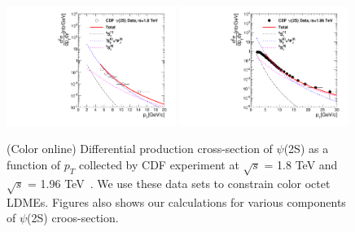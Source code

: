 \documentclass[aps,prc,preprint,superscriptaddress,showpacs,showkeys,amsmath]{revtex4-1}
\begin{document}
\begin{figure}
\includegraphics[width=0.49\textwidth]{Figures/Psi2S/Psi2S_CDF_180TeV.pdf}
\includegraphics[width=0.49\textwidth]{Figures/Psi2S/Psi2S_CDF_196TeV.pdf}
\caption{(Color online) Differential production cross-section of $\psi$(2S) as a function of $p_{T}$ 
collected by CDF experiment at $\sqrt{s}$ = 1.8 TeV and $\sqrt{s}$ = 1.96 TeV~\cite{Acosta:2004yw}. 
We use these data sets to constrain color octet LDMEs. Figures also shows our calculations for various components 
of $\psi$(2S) croos-section.}
\label{Fig:LDMEPsi2SCDF}
\end{figure}
\end{document}
